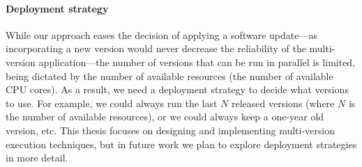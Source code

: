 \paragraph{Deployment strategy} While our approach eases the decision of
applying a software update---as incorporating a new version would never
decrease the reliability of the multi-version application---the number of
versions that can be run in parallel is limited, being dictated by the number
of available resources (\eg the number of available CPU cores).  As a result,
we need a deployment strategy to decide what versions to use.  For example, we
could always run the last $N$ released versions (where $N$ is the number of
available resources), or we could always keep a one-year old version, etc.
This thesis focuses on designing and implementing multi-version execution
techniques, but in future work we plan to explore deployment strategies in more
detail.
